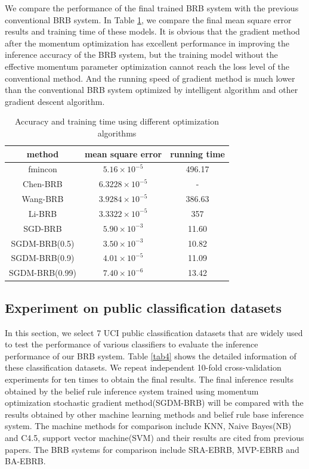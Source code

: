 \documentclass{ieeeaccess}
\begin{document}
We compare the performance of the final trained BRB system with the previous conventional BRB system.
In Table \ref{tab3}, we compare the final mean square error results and training time of these models.
It is obvious that the gradient method after the momentum optimization has excellent performance in improving the inference accuracy of the BRB system,
but the training model without the effective momentum parameter optimization cannot reach the loss level of the conventional method.
And the running speed of gradient method is much lower than the conventional BRB system optimized by intelligent algorithm and other gradient descent algorithm.

\begin{table}
    \caption{Accuracy and training time using different optimization algorithms}
    \centering
    \label{tab3}
    \begin{tabular}{ccc}
        \hline
        method         & mean square error     & running time \\
        \hline
        fmincon        & $5.16\times10^{-5}$   & 496.17       \\
        Chen-BRB       & $6.3228\times10^{-5}$ & -            \\
        Wang-BRB       & $3.9284\times10^{-5}$ & 386.63       \\
        Li-BRB         & $3.3322\times10^{-5}$ & 357          \\
        SGD-BRB        & $5.90\times10^{-3}$   & 11.60        \\
        SGDM-BRB(0.5)  & $3.50\times10^{-3}$   & 10.82        \\
        SGDM-BRB(0.9)  & $4.01\times10^{-5}$   & 11.09        \\
        SGDM-BRB(0.99) & $7.40\times10^{-6}$   & 13.42        \\
        \hline
    \end{tabular}
\end{table}

\subsection{Experiment on public classification datasets}
In this section, we select 7 UCI public classification datasets that are widely used to test the performance of various classifiers to evaluate the inference performance of our BRB system.
Table \ref{tab4} shows the detailed information of these classification datasets.
We repeat independent 10-fold cross-validation experiments for ten times to obtain the final results.
The final inference results obtained by the belief rule inference system trained using momentum optimization stochastic gradient method(SGDM-BRB) will be compared with the results obtained by
other machine learning methods and belief rule base inference system.
The machine methods for comparison include KNN, Naive Bayes(NB) and C4.5, support vector machine(SVM)
and their results are cited from previous papers\cite{a22,a27}.
The BRB systems for comparison include SRA-EBRB\cite{a20}, MVP-EBRB\cite{a21} and BA-EBRB\cite{a22}.
\end{document}
